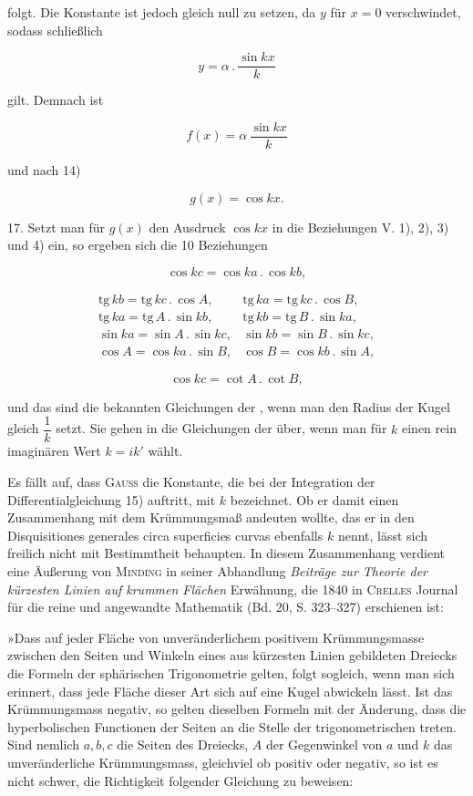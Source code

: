 %
\noindent folgt. Die Konstante ist jedoch gleich null zu setzen, da $y$ für $x = 0$ verschwindet, sodass schließlich

\[
y = \alpha \,.\, \frac{\sin kx}{k}
\]

gilt. Demnach ist

\[
f(x) = \alpha\, \frac{\sin kx}{k}
\]

und nach 14)

\[
\tag*{(G)} g(x) = \cos kx.
\]

17. Setzt man für $g(x)$ den Ausdruck $\cos kx$ in die Beziehungen V. 1), 2), 3) und 4) ein, so ergeben sich die 10 Beziehungen

\[
\cos kc = \cos ka \,.\, \cos kb,
\]

\[
\begin{array}{cc}
\mathrm{tg}\, kb = \mathrm{tg}\, kc \,.\, \cos A, & \mathrm{tg}\, ka = \mathrm{tg}\, kc \,.\, \cos B, \\[4pt]
\mathrm{tg}\, ka = \mathrm{tg}\, A \,.\, \sin kb, & \mathrm{tg}\, kb = \mathrm{tg}\, B \,.\, \sin ka, \\[4pt]
\sin ka = \sin A \,.\, \sin kc, & \sin kb = \sin B \,.\, \sin kc, \\[4pt]
\cos A = \cos ka \,.\, \sin B, & \cos B = \cos kb \,.\, \sin A,
\end{array}
\]

\[
\cos kc = \cot A \,.\, \cot B,
\]

und das sind die bekannten Gleichungen der , wenn man den Radius der Kugel gleich $\dfrac{1}{k}$ setzt. Sie gehen in die Gleichungen der  über, wenn man für $k$ einen rein imaginären Wert $k = ik'$ wählt.

Es fällt auf, dass \textsc{Gauss} die Konstante, die bei der Integration der Differentialgleichung 15) auftritt, mit $k$ bezeichnet. Ob er damit einen Zusammenhang mit dem Krümmungsmaß andeuten wollte, das er in den Disquisitiones generales circa superficies curvas ebenfalls $k$ nennt, lässt sich freilich nicht mit Bestimmtheit behaupten. In diesem Zusammenhang verdient eine Äußerung von \textsc{Minding} in seiner Abhandlung \emph{Beiträge zur Theorie der kürzesten Linien auf krummen Flächen} Erwähnung, die 1840 in \textsc{Crelles} Journal für die reine und angewandte Mathematik (Bd. 20, S. 323--327) erschienen ist:

»Dass auf jeder Fläche von unveränderlichem positivem Krümmungsmasse zwischen den Seiten und Winkeln eines aus kürzesten Linien gebildeten Dreiecks die Formeln der sphärischen Trigonometrie gelten, folgt sogleich, wenn man sich erinnert, dass jede Fläche dieser Art sich auf eine Kugel abwickeln lässt. Ist das Krümmungsmass negativ, so gelten dieselben Formeln mit der Änderung, dass die hyperbolischen Functionen der Seiten an die Stelle der trigonometrischen treten. Sind nemlich $a, b, c$ die Seiten des Dreiecks, $A$ der Gegenwinkel von $a$ und $k$ das unveränderliche Krümmungsmass, gleichviel ob positiv oder negativ, so ist es nicht schwer, die Richtigkeit folgender Gleichung zu beweisen:

